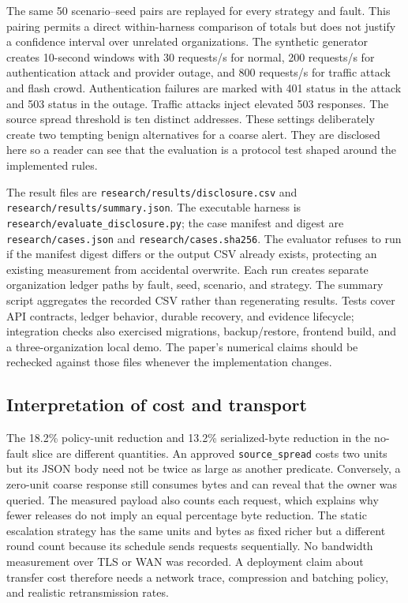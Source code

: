 \documentclass[conference,letterpaper]{IEEEtran}
\begin{document}
The same 50 scenario--seed pairs are replayed for every strategy and fault. This pairing permits a direct within-harness comparison of totals but does not justify a confidence interval over unrelated organizations. The synthetic generator creates 10-second windows with 30 requests/s for normal, 200 requests/s for authentication attack and provider outage, and 800 requests/s for traffic attack and flash crowd. Authentication failures are marked with 401 status in the attack and 503 status in the outage. Traffic attacks inject elevated 503 responses. The source spread threshold is ten distinct addresses. These settings deliberately create two tempting benign alternatives for a coarse alert. They are disclosed here so a reader can see that the evaluation is a protocol test shaped around the implemented rules.

The result files are \texttt{research/results/disclosure.csv} and \texttt{research/results/summary.json}. The executable harness is \texttt{research/evaluate\_disclosure.py}; the case manifest and digest are \texttt{research/cases.json} and \texttt{research/cases.sha256}. The evaluator refuses to run if the manifest digest differs or the output CSV already exists, protecting an existing measurement from accidental overwrite. Each run creates separate organization ledger paths by fault, seed, scenario, and strategy. The summary script aggregates the recorded CSV rather than regenerating results. Tests cover API contracts, ledger behavior, durable recovery, and evidence lifecycle; integration checks also exercised migrations, backup/restore, frontend build, and a three-organization local demo. The paper's numerical claims should be rechecked against those files whenever the implementation changes.

\subsection{Interpretation of cost and transport}
The 18.2\% policy-unit reduction and 13.2\% serialized-byte reduction in the no-fault slice are different quantities. An approved \texttt{source\_spread} costs two units but its JSON body need not be twice as large as another predicate. Conversely, a zero-unit coarse response still consumes bytes and can reveal that the owner was queried. The measured payload also counts each request, which explains why fewer releases do not imply an equal percentage byte reduction. The static escalation strategy has the same units and bytes as fixed richer but a different round count because its schedule sends requests sequentially. No bandwidth measurement over TLS or WAN was recorded. A deployment claim about transfer cost therefore needs a network trace, compression and batching policy, and realistic retransmission rates.
\end{document}
